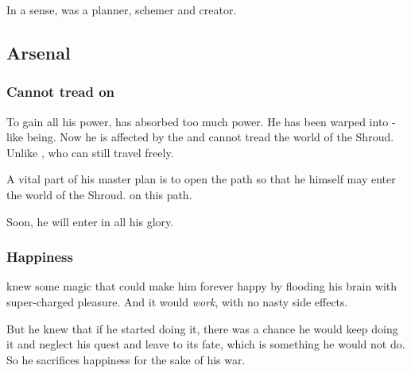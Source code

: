 In a sense, \Secherdamon{} was a planner, schemer and creator. 









\subsection{Arsenal}





\subsubsection{Cannot tread on \Miith}
To gain all his power, \Secherdamon{} has absorbed too much \xzaishannic{} power. 
He has been warped into \xzaishann-like being. 
Now he is affected by the  and cannot tread the world of the Shroud. Unlike \Ishnaruchaefir, who can still travel freely.

A vital part of his master plan is to open the path so that he himself may enter the world of the Shroud.  on this path.

Soon, he will enter \Miith{} in all his glory.






\subsubsection{Happiness}
\Secherdamon{} knew some magic that could make him forever happy by flooding his brain with super-charged pleasure. 
And it would \emph{work}, with no nasty side effects. 

But he knew that if he started doing it, there was a chance he would keep doing it and neglect his quest and leave \Miith{} to its fate, which is something he would not do. 
So he sacrifices happiness for the sake of his war. 

